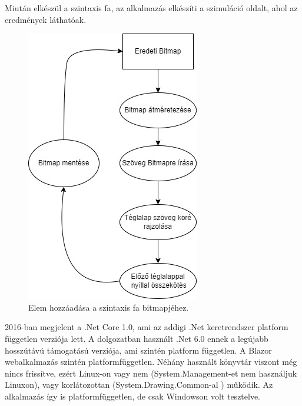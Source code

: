 Miután elkészül a szintaxis fa, az alkalmazás elkészíti a szimuláció oldalt, ahol az eredmények láthatóak.

\begin{figure}[h]
\centering
\includegraphics[scale=0.7]{images/ST.jpg}
\caption{Elem hozzáadása a szintaxis fa bitmapjéhez.}
\label{fig:st}
\end{figure}

\newpage
{}
2016-ban megjelent a .Net Core 1.0, ami az addigi .Net keretrendszer platform független verziója lett. A dolgozatban használt .Net 6.0 ennek a legújabb hosszútávú támogatású verziója, ami szintén platform független. A Blazor webalkalmazás szintén platformfüggetlen. Néhány használt könyvtár viszont még nincs  frissítve, ezért Linux-on vagy nem (System.Management-et nem használjuk Linuxon), vagy korlátozottan (System.Drawing.Common-al \cite{drawing})  működik. Az alkalmazás így is platformfüggetlen, de csak Windowson volt tesztelve.



